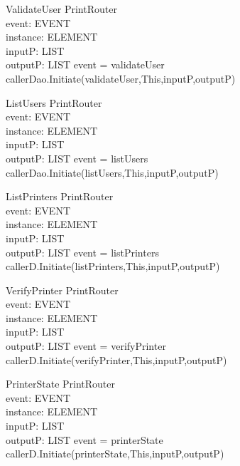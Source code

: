 \begin{schema}{ValidateUser}
\Delta PrintRouter \\
event: EVENT \\
instance: ELEMENT \\
inputP: LIST \\
outputP: LIST
\where event = validateUser \\
callerDao.Initiate(validateUser,This,inputP,outputP)
\end{schema}

\begin{schema}{ListUsers}
\Delta PrintRouter \\
event: EVENT \\
instance: ELEMENT \\
inputP: LIST \\
outputP: LIST
\where event = listUsers \\
callerDao.Initiate(listUsers,This,inputP,outputP)
\end{schema}

\begin{schema}{ListPrinters}
\Delta PrintRouter \\
event: EVENT \\
instance: ELEMENT \\
inputP: LIST \\
outputP: LIST
\where event = listPrinters \\
callerD.Initiate(listPrinters,This,inputP,outputP)
\end{schema}


\begin{schema}{VerifyPrinter}
\Delta PrintRouter \\
event: EVENT \\
instance: ELEMENT \\
inputP: LIST \\
outputP: LIST
\where event = verifyPrinter \\
callerD.Initiate(verifyPrinter,This,inputP,outputP)
\end{schema}

\begin{schema}{PrinterState}
\Delta PrintRouter \\
event: EVENT \\
instance: ELEMENT \\
inputP: LIST \\
outputP: LIST
\where event = printerState \\
callerD.Initiate(printerState,This,inputP,outputP)
\end{schema}


